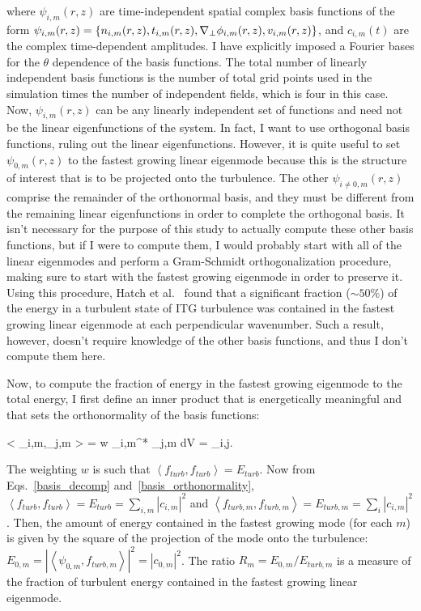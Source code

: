 where $\psi_{i,m}(r,z)$ are time-independent spatial complex basis functions of the form $\psi_{i,m}(r,z) = \left\{ n_{i,m}(r,z),t_{i,m}(r,z),\nabla_\perp \phi_{i,m}(r,z), v_{i,m}(r,z) \right\}$,
and $c_{i,m}(t)$ are the complex time-dependent amplitudes. I have explicitly imposed a Fourier bases for the $\theta$ dependence of the basis functions. The total number of
linearly independent basis functions is the number of total grid points used in the simulation times the number of independent fields, which is four in this case.
Now, $\psi_{i,m}(r,z)$ can be any linearly independent set of functions and need not be the linear eigenfunctions
of the system. In fact, I want to use orthogonal basis functions, ruling out the linear eigenfunctions.
However, it is quite useful to set $\psi_{0,m}(r,z)$ to the fastest
growing linear eigenmode because this is the structure of interest that is to be projected onto the turbulence. 
The other $\psi_{i \ne 0,m}(r,z)$ comprise the remainder of the orthonormal basis, and they must be different from
the remaining linear eigenfunctions in order to complete the orthogonal basis. It isn't necessary for the purpose of this study to actually compute these other basis functions, but if I were to compute
them, I would probably start with all of the linear eigenmodes
and perform a Gram-Schmidt orthogonalization procedure, making sure to start with the fastest growing eigenmode in order to preserve it. Using this procedure, Hatch et al.~\cite{hatch2011}
found that a significant fraction ($\sim 50\%$) of the energy in a turbulent state of ITG turbulence was contained in the fastest growing linear eigenmode at each perpendicular wavenumber.
Such a result, however, doesn't require knowledge of the other basis functions, and thus I don't compute them here.

Now, to compute the fraction of energy in the fastest growing eigenmode to the total energy, 
I first define an inner product that is energetically meaningful and that sets the orthonormality of the basis functions:

\beq
\label{basis_orthonormality}
\left< \psi_{i,m},\psi_{j,m} \right> = \int w \psi_{i,m}^* \cdot \psi_{j,m} dV = \delta_{i,j}.
\eeq

The weighting $w$ is such that $\left< f_{turb}, f_{turb} \right> = E_{turb}$.
Now from Eqs.~\ref{basis_decomp} and~\ref{basis_orthonormality}, $\left< f_{turb}, f_{turb} \right> = E_{turb} = \sum_{i,m} |c_{i,m}|^2$ and 
$\left< f_{turb,m}, f_{turb,m} \right> = E_{turb,m} = \sum_i |c_{i,m}|^2$.
Then, the amount of energy contained in the fastest growing mode (for each $m$) is given by the square of the projection
of the mode onto the turbulence: $E_{0,m} = \left| \left< \psi_{0,m}, f_{turb,m} \right> \right|^2 = |c_{0,m}|^2$. The ratio 
$R_m = E_{0,m}/E_{turb,m}$ is a measure of the fraction of turbulent energy contained in the fastest growing linear eigenmode. 

